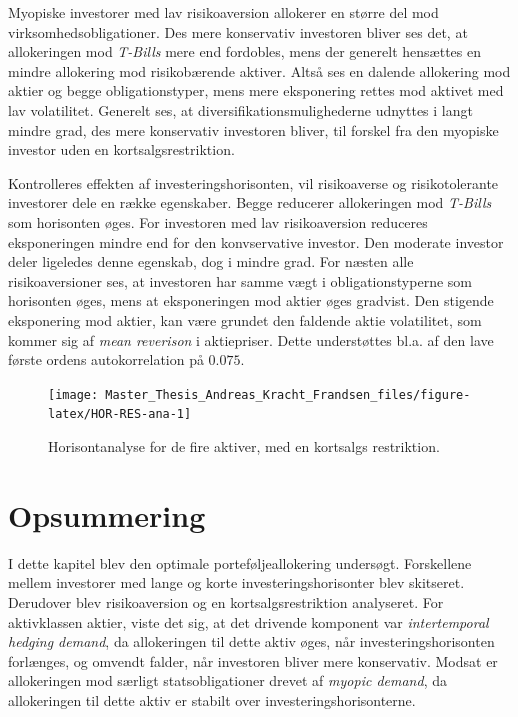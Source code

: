\documentclass[
  a4paper,
  oneside]{memoir}
\begin{document}
Myopiske investorer med lav risikoaversion allokerer en større del mod virksomhedsobligationer. Des mere konservativ investoren bliver ses det, at allokeringen mod \emph{T-Bills} mere end fordobles, mens der generelt hensættes en mindre allokering mod risikobærende aktiver. Altså ses en dalende allokering mod aktier og begge obligationstyper, mens mere eksponering rettes mod aktivet med lav volatilitet. Generelt ses, at diversifikationsmulighederne udnyttes i langt mindre grad, des mere konservativ investoren bliver, til forskel fra den myopiske investor uden en kortsalgsrestriktion.

Kontrolleres effekten af investeringshorisonten, vil risikoaverse og risikotolerante investorer dele en række egenskaber. Begge reducerer allokeringen mod \emph{T-Bills} som horisonten øges. For investoren med lav risikoaversion reduceres eksponeringen mindre end for den konvservative investor. Den moderate investor deler ligeledes denne egenskab, dog i mindre grad. For næsten alle risikoaversioner ses, at investoren har samme vægt i obligationstyperne som horisonten øges, mens at eksponeringen mod aktier øges gradvist. Den stigende eksponering mod aktier, kan være grundet den faldende aktie volatilitet, som kommer sig af \emph{mean reverison} i aktiepriser. Dette understøttes bl.a. af den lave første ordens autokorrelation på \(0.075\).\\

\begin{figure}[H]

{\centering \texttt{[image: Master\_Thesis\_Andreas\_Kracht\_Frandsen\_files/figure-latex/HOR-RES-ana-1]} 

}

\caption{Horisontanalyse for de fire aktiver, med en kortsalgs restriktion.}\label{fig:HOR-RES-ana}
\end{figure}

\hypertarget{opsummering-4}{%
\section{Opsummering}\label{opsummering-4}}

I dette kapitel blev den optimale porteføljeallokering undersøgt. Forskellene mellem investorer med lange og korte investeringshorisonter blev skitseret. Derudover blev risikoaversion og en kortsalgsrestriktion analyseret. For aktivklassen aktier, viste det sig, at det drivende komponent var \emph{intertemporal hedging demand}, da allokeringen til dette aktiv øges, når investeringshorisonten forlænges, og omvendt falder, når investoren bliver mere konservativ. Modsat er allokeringen mod særligt statsobligationer drevet af \emph{myopic demand}, da allokeringen til dette aktiv er stabilt over investeringshorisonterne.
\end{document}
